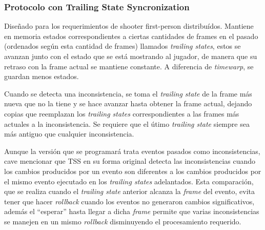 \subsubsection{Protocolo con Trailing State Syncronization}

Diseñado para los requerimientos de shooter first-person distribuídos. Mantiene en memoria estados correspondientes a ciertas cantidades de frames en el pasado (ordenados según esta cantidad de frames) llamados \emph{trailing states}, estos se avanzan junto con el estado que se está mostrando al jugador, de manera que su retraso con la frame actual se mantiene constante. A diferencia de \emph{timewarp}, se guardan menos estados.

Cuando se detecta una inconsistencia, se toma el \emph{trailing state} de la frame más nueva que no la tiene y se hace avanzar hasta obtener la frame actual, dejando copias que reemplazan los \emph{trailing states} correspondientes a las frames más actuales a la inconsistencia. Se requiere que el útimo \emph{trailing state} siempre sea más antiguo que cualquier inconsistencia.

Aunque la versión que se programará trata eventos pasados como inconsistencias, cave mencionar que TSS en su forma original detecta las inconsistencias cuando los cambios producidos por un evento son diferentes a los cambios producidos por el mismo evento ejecutado en los \emph{trailing states} adelantados. Esta comparación, que se realiza cuando el \emph{trailing state} anterior alcanza la \emph{frame} del evento, evita tener que hacer \emph{rollback} cuando los eventos no generaron cambios significativos, además el ``esperar'' hasta llegar a dicha \emph{frame} permite que varias inconsistencias se manejen en un mismo \emph{rollback} disminuyendo el procesamiento requerido.



